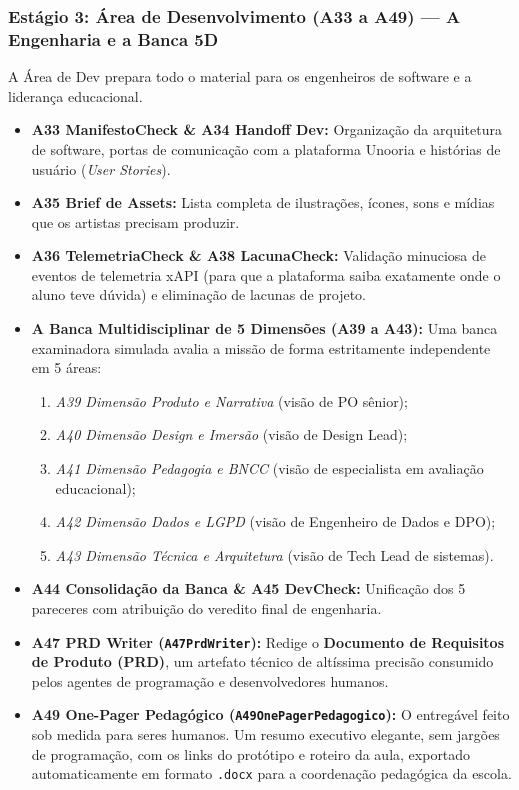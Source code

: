 \documentclass[11pt,a4paper]{article}
\begin{document}
\subsubsection{Estágio 3: Área de Desenvolvimento (A33 a A49) --- A Engenharia e a Banca 5D}
A Área de Dev prepara todo o material para os engenheiros de software e a liderança educacional.
\begin{itemize}
  \item \textbf{A33 ManifestoCheck \& A34 Handoff Dev:} Organização da arquitetura de software, portas de comunicação com a plataforma Unooria e histórias de usuário (\textit{User Stories}).
  \item \textbf{A35 Brief de Assets:} Lista completa de ilustrações, ícones, sons e mídias que os artistas precisam produzir.
  \item \textbf{A36 TelemetriaCheck \& A38 LacunaCheck:} Validação minuciosa de eventos de telemetria xAPI (para que a plataforma saiba exatamente onde o aluno teve dúvida) e eliminação de lacunas de projeto.
  \item \textbf{A Banca Multidisciplinar de 5 Dimensões (A39 a A43):} Uma banca examinadora simulada avalia a missão de forma estritamente independente em 5 áreas:
    \begin{enumerate}[noitemsep]
      \item \textit{A39 Dimensão Produto e Narrativa} (visão de PO sênior);
      \item \textit{A40 Dimensão Design e Imersão} (visão de Design Lead);
      \item \textit{A41 Dimensão Pedagogia e BNCC} (visão de especialista em avaliação educacional);
      \item \textit{A42 Dimensão Dados e LGPD} (visão de Engenheiro de Dados e DPO);
      \item \textit{A43 Dimensão Técnica e Arquitetura} (visão de Tech Lead de sistemas).
    \end{enumerate}
  \item \textbf{A44 Consolidação da Banca \& A45 DevCheck:} Unificação dos 5 pareceres com atribuição do veredito final de engenharia.
  \item \textbf{A47 PRD Writer (\texttt{A47PrdWriter}):} Redige o \textbf{Documento de Requisitos de Produto (PRD)}, um artefato técnico de altíssima precisão consumido pelos agentes de programação e desenvolvedores humanos.
  \item \textbf{A49 One-Pager Pedagógico (\texttt{A49OnePagerPedagogico}):} O entregável feito sob medida para seres humanos. Um resumo executivo elegante, sem jargões de programação, com os links do protótipo e roteiro da aula, exportado automaticamente em formato \texttt{.docx} para a coordenação pedagógica da escola.
\end{itemize}
\end{document}
